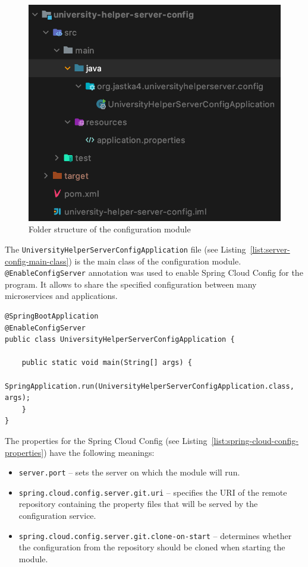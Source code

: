 \begin{figure}[htb]
    \centering
    \includegraphics[width=.46\linewidth]{fig04/server-config-folder-structure.png}
    \caption{Folder structure of the configuration module}
    \label{fig:server-config-folder-structure}
\end{figure}

The \texttt{UniversityHelperServerConfigApplication} file (see Listing~\ref{list:server-config-main-class}) is the main class of the configuration module. \texttt{@EnableConfigServer} annotation was used to enable Spring Cloud Config for the program. It allows to share the specified configuration between many microservices and applications.

\begin{lstlisting}[label=list:server-config-main-class,caption=Server configuration main class, basicstyle=\footnotesize\ttfamily]
@SpringBootApplication
@EnableConfigServer
public class UniversityHelperServerConfigApplication {

	public static void main(String[] args) {
		SpringApplication.run(UniversityHelperServerConfigApplication.class, args);
	}
}
\end{lstlisting}

The properties for the Spring Cloud Config (see Listing~\ref{list:spring-cloud-config-properties}) have the following meanings:
\begin{itemize}
    \item \texttt{server.port} -- sets the server on which the module will run.
    \item \texttt{spring.cloud.config.server.git.uri} -- specifies the URI of the remote repository containing the property files that will be served by the configuration service.
    \item \texttt{spring.cloud.config.server.git.clone-on-start} -- determines whether the configuration from the repository should be cloned when starting the module.
\end{itemize}

